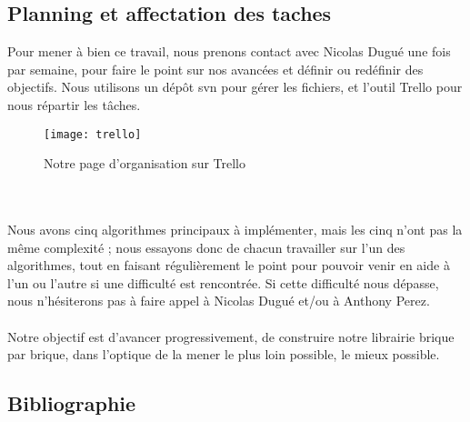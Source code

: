 \begin{titlepage}
\newpage
\begin{center}
\begin{bf}
\section{Planning et affectation des taches}
\end{bf}
\end{center}

\vspace{1cm}
{
Pour mener à bien ce travail, nous prenons contact avec Nicolas Dugué une fois par semaine, pour faire le point sur nos avancées et définir ou redéfinir des objectifs. Nous utilisons un dépôt svn pour gérer les fichiers, et l'outil Trello pour nous répartir les tâches.
\begin{figure}[h]
\centering
\texttt{[image: trello]}
\caption{Notre page d'organisation sur Trello}
\end{figure}
\\ \\
Nous avons cinq algorithmes principaux à implémenter, mais les cinq n'ont pas la même complexité ; nous essayons donc de chacun travailler sur l'un des algorithmes, tout en faisant régulièrement le point pour pouvoir venir en aide à l'un ou l'autre si une difficulté est rencontrée. Si cette difficulté nous dépasse, nous n'hésiterons pas à faire appel à Nicolas Dugué et/ou à Anthony Perez.
\\ \\
Notre objectif est d'avancer progressivement, de construire notre librairie brique par brique, dans l'optique de la mener le plus loin possible, le mieux possible.
}


\newpage
\begin{center}
\begin{bf}
\section{Bibliographie}
\end{bf}
\end{center}
 
	
\end{titlepage}
